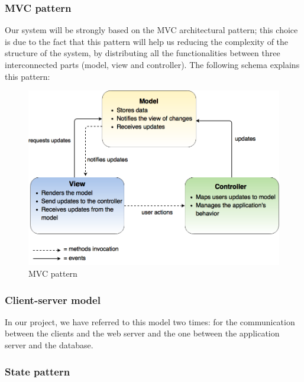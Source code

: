 \subsubsection{MVC pattern}

    Our system will be strongly based on the MVC architectural pattern; this choice is due to the fact that this pattern will help us reducing the complexity of the structure of the system, by distributing all the functionalities between three interconnected parts (model, view and controller).
    \newline
    \newline
    The following schema explains this pattern:
    \begin{figure}[H]
            \centering
            \includegraphics[width=15cm]{./Images/MVC.png}
            \caption{MVC pattern}
    \end{figure}

\subsubsection{Client-server model}

    In our project, we have referred to this model two times: for the communication between the clients and the web server and the one between the application server and the database.

\subsubsection{State pattern}

